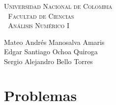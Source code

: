 \documentclass[12pt, a4paper]{article}%
\begin{document}
\setlength{\parindent}{0cm}
\hoffset-0.46cm
\voffset-1.46cm

\begin{window}
\large\scshape  \hspace{0.4cm}\textsf{Universidad Nacional de Colombia} \\
\textcolor{white}{\tiny.}  \large \hspace{1.5cm} \textsf{Facultad de Ciencias} \\
\textcolor{white}{\tiny.}   \normalsize\hspace{2.2cm}\textsf{Análisis Numérico I}\\
 

\end{window}

\vspace{0.2cm}
\small
\textsf{Mateo Andrés Manosalva Amaris\\
Edgar Santiago Ochoa Quiroga\\
Sergio Alejandro Bello Torres} 
\normalsize
\dotfill
\vspace{0.7cm}

\section*{Problemas}
\end{document}
